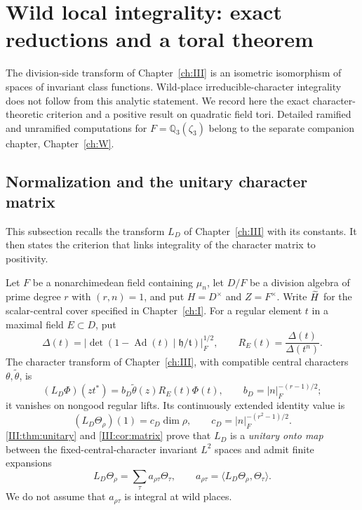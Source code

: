 \section{Wild local integrality: exact reductions and a toral theorem}\label{IV:sec:wild}
The division-side transform of Chapter~\ref{ch:III} is an isometric isomorphism of
spaces of invariant class functions.  Wild-place irreducible-character
integrality does not follow from this analytic statement.  We record
here the exact character-theoretic criterion and a positive result on
quadratic field tori.  Detailed ramified and unramified computations
for $F=\mathbb Q_3(\zeta_3)$ belong to the separate companion chapter,
Chapter~\ref{ch:W}.

\subsection{Normalization and the unitary character matrix}\label{IV:subsec:integral}
This subsection recalls the transform $L_D$ of Chapter~\ref{ch:III} with its constants. It then states the criterion that links integrality of the character matrix to positivity.

Let $F$ be a nonarchimedean field containing $\mu_n$, let $D/F$
be a division algebra of prime degree $r$ with $(r,n)=1$, and put
$H=D^\times$ and $Z=F^\times$.  Write $\widetilde H$ for the scalar-central
cover specified in Chapter~\ref{ch:I}.  For a regular element $t$ in a maximal
field $E\subset D$, put
\begin{equation}\label{IV:eq:Delta}
\Delta(t)=\left|\det(1-\operatorname{Ad}(t)\mid
\mathfrak h/\mathfrak t)\right|_F^{1/2},\qquad
R_E(t)=\frac{\Delta(t)}{\Delta(t^n)}.
\end{equation}
The character transform of Chapter~\ref{ch:III}, with compatible central
characters $\theta,\widetilde\theta$, is
\begin{equation}\label{IV:eq:LD}
(L_D\Phi)(z t^*)=b_D\widetilde\theta(z)R_E(t)\Phi(t),
\qquad b_D=|n|_F^{-(r-1)/2};
\end{equation}
it vanishes on nongood regular lifts.  Its continuously extended
identity value is
\begin{equation}\label{IV:eq:cD}
(L_D\Theta_\rho)(1)=c_D\dim\rho,\qquad
c_D=|n|_F^{-(r^2-1)/2}.
\end{equation}
\cref{III:thm:unitary} and \cref{III:cor:matrix} prove that $L_D$ is a
\emph{unitary onto map} between the fixed-central-character invariant
$L^2$ spaces and admit finite expansions
\begin{equation}\label{IV:eq:matrixchars}
L_D\Theta_\rho=\sum_\tau a_{\rho\tau}\Theta_\tau,
\qquad a_{\rho\tau}=\langle L_D\Theta_\rho,\Theta_\tau\rangle.
\end{equation}
We do not assume that $a_{\rho\tau}$ is integral at wild places.

